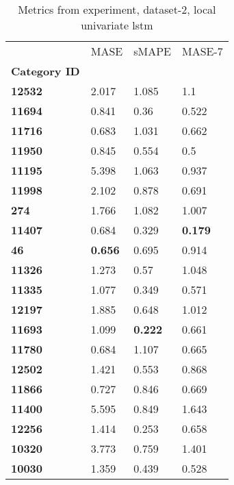 \begin{table}[H]
\centering
\caption{Metrics from experiment, dataset-2, local univariate lstm}
\label{table:local-univariate-lstm-dataset-2}
\begin{tabular}{llll}
\toprule
{} &            MASE &           sMAPE &          MASE-7 \\
\textbf{Category ID} &                 &                 &                 \\
\midrule
\textbf{12532      } &           2.017 &           1.085 &             1.1 \\
\textbf{11694      } &           0.841 &            0.36 &           0.522 \\
\textbf{11716      } &           0.683 &           1.031 &           0.662 \\
\textbf{11950      } &           0.845 &           0.554 &             0.5 \\
\textbf{11195      } &           5.398 &           1.063 &           0.937 \\
\textbf{11998      } &           2.102 &           0.878 &           0.691 \\
\textbf{274        } &           1.766 &           1.082 &           1.007 \\
\textbf{11407      } &           0.684 &           0.329 &  \textbf{0.179} \\
\textbf{46         } &  \textbf{0.656} &           0.695 &           0.914 \\
\textbf{11326      } &           1.273 &            0.57 &           1.048 \\
\textbf{11335      } &           1.077 &           0.349 &           0.571 \\
\textbf{12197      } &           1.885 &           0.648 &           1.012 \\
\textbf{11693      } &           1.099 &  \textbf{0.222} &           0.661 \\
\textbf{11780      } &           0.684 &           1.107 &           0.665 \\
\textbf{12502      } &           1.421 &           0.553 &           0.868 \\
\textbf{11866      } &           0.727 &           0.846 &           0.669 \\
\textbf{11400      } &           5.595 &           0.849 &           1.643 \\
\textbf{12256      } &           1.414 &           0.253 &           0.658 \\
\textbf{10320      } &           3.773 &           0.759 &           1.401 \\
\textbf{10030      } &           1.359 &           0.439 &           0.528 \\
\bottomrule
\end{tabular}
\end{table}

